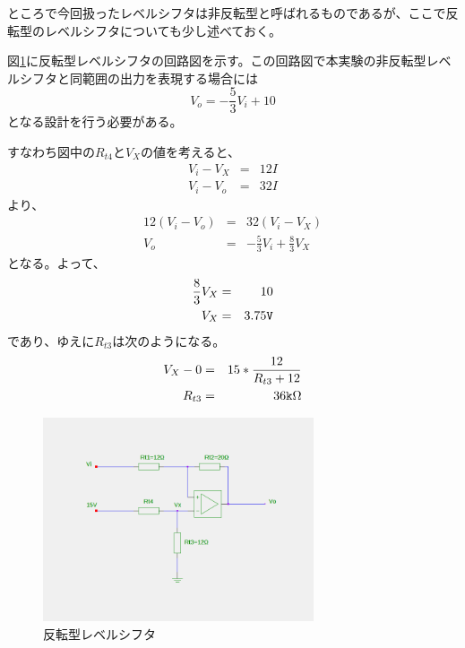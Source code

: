 \documentclass[11pt,a4j]{jsarticle}
\begin{document}
   ところで今回扱ったレベルシフタは非反転型と呼ばれるものであるが、ここで反転型のレベルシフタについても少し述べておく。
   
   図\ref{fig:reverse}に反転型レベルシフタの回路図を示す。この回路図で本実験の非反転型レベルシフタと同範囲の出力を表現する場合には
   \begin{equation}
   V_o = -\frac{5}{3} V_i + 10
   \end{equation}
   となる設計を行う必要がある。
   
   すなわち図中の$R_{t4}$と$V_X$の値を考えると、
   \begin{eqnarray}
   V_i - V_X &=& 12I \nonumber \\
   V_i - V_o &=& 32I \nonumber
   \end{eqnarray}
   より、
   \begin{eqnarray}
   12(V_i - V_o) &=& 32 (V_i - V_X) \nonumber \\
   V_o &=& -\frac{5}{3} V_i + \frac{8}{3} V_X \nonumber
   \end{eqnarray}
   となる。よって、
   \begin{eqnarray}
   \frac{8}{3} V_X &=& 10 \nonumber \\
   V_X &=& 3.75 \verb|V| \nonumber
   \end{eqnarray}
   であり、ゆえに$R_{t3}$は次のようになる。
   \begin{eqnarray}
   V_X - 0 &=& 15 * \frac{12}{R_{t3} +12} \nonumber \\
   R_{t3} &=& 36 \verb|k| \Omega \nonumber
   \end{eqnarray}
   
   \begin{figure}[htbp]
  \centering
  \includegraphics[width=8cm,clip]{reverse_levelshifter.png}
  \caption{反転型レベルシフタ}
  \label{fig:reverse}
 \end{figure}
   
   \clearpage
   
\end{document}
